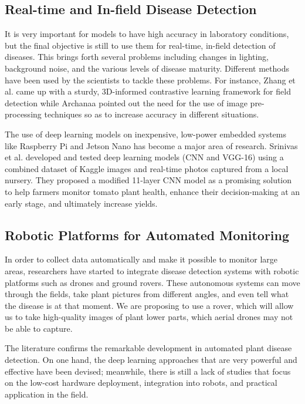 \documentclass[pdflatex,sn-mathphys-num,iicol]{sn-jnl} %
\theoremstyle{thmstyleone}
\theoremstyle{thmstyletwo}
\theoremstyle{thmstylethree}
\begin{document}
\subsection{Real-time and In-field Disease Detection}

It is very important for models to have high accuracy in laboratory conditions, but the final objective is still to use them for real-time, in-field detection of diseases. This brings forth several problems including changes in lighting, background noise, and the various levels of disease maturity. Different methods have been used by the scientists to tackle these problems. For instance,  Zhang et al. \cite{23} came up with a sturdy, 3D-informed contrastive learning framework for field detection while Archanaa \cite{24} pointed out the need for the use of image pre-processing techniques so as to increase accuracy in different situations.

The use of deep learning models on inexpensive, low-power embedded systems like Raspberry Pi and Jetson Nano has become a major area of research. Srinivas et al.\cite{26} developed and tested deep learning models (CNN and VGG-16) using a combined dataset of Kaggle images and real-time photos captured from a local nursery. They proposed a modified 11-layer CNN model as a promising solution to help farmers monitor tomato plant health, enhance their decision-making at an early stage, and ultimately increase yields.


\subsection{Robotic Platforms for Automated Monitoring}

In order to collect data automatically and make it possible to monitor large areas, researchers have started to integrate disease detection systems with robotic platforms such as drones and ground rovers. These autonomous systems can move through the fields, take plant pictures from different angles, and even tell what the disease is at that moment. We are proposing to use a rover, which will allow us to take high-quality images of plant lower parts, which aerial drones may not be able to capture.

The literature confirms the remarkable development in automated plant disease detection. On one hand, the deep learning approaches that are very powerful and effective have been devised; meanwhile, there is still a lack of studies that focus on the low-cost hardware deployment, integration into robots, and practical application in the field.
\end{document}
